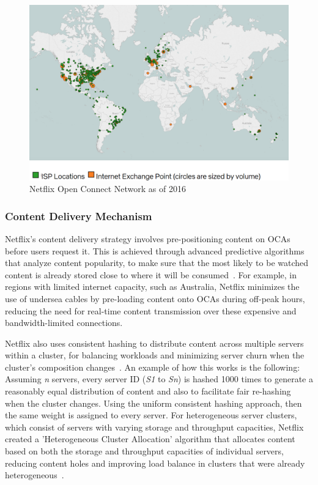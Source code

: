 \begin{figure}[htpb]
    \centering
    \includegraphics[width=\linewidth]{images/NetflixISP.png}
    \caption[Netflix Open Connect Network as of 2016]{Netflix Open Connect Network as of 2016}\label{fig:netflix-isp}
\end{figure}

\subsubsection{Content Delivery Mechanism}

Netflix's content delivery strategy involves pre-positioning content on \ac{OCAs} before users request it. This is achieved through advanced predictive algorithms that analyze content popularity, to make sure that the most likely to be watched content is already stored close to where it will be consumed~\parencite{netflix_cloud}. For example, in regions with limited internet capacity, such as Australia, Netflix minimizes the use of undersea cables by pre-loading content onto \ac{OCAs} during off-peak hours, reducing the need for real-time content transmission over these expensive and bandwidth-limited connections.

Netflix also uses consistent hashing to distribute content across multiple servers within a cluster, for balancing workloads and minimizing server churn when the cluster's composition changes~\parencite{netflix_content_distribution}. An example of how this works is the following: Assuming \textit{n} servers, every server ID (\textit{S1} to \textit{Sn}) is hashed 1000 times to generate a reasonably equal distribution of content and also to facilitate fair re-hashing when the cluster changes. Using the uniform consistent hashing approach, then the same weight is assigned to every server.
For heterogeneous server clusters, which consist of servers with varying storage and throughput capacities, Netflix created a 'Heterogeneous Cluster Allocation' algorithm that allocates content based on both the storage and throughput capacities of individual servers, reducing content holes and improving load balance in clusters that were already heterogeneous~\parencite{netflix_content_distribution}.

